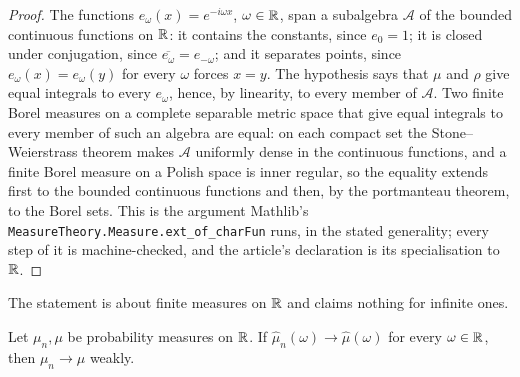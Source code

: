 \begin{proof}
The functions $e_\omega(x) = e^{-i\omega x}$, $\omega \in \mathbb{R}$, span a subalgebra $\mathcal{A}$
of the bounded continuous functions on $\mathbb{R}$: it contains the constants, since $e_0 = 1$; it is
closed under conjugation, since $\overline{e_\omega} = e_{-\omega}$; and it separates points,
since $e_\omega(x) = e_\omega(y)$ for every $\omega$ forces $x = y$. The hypothesis says that
$\mu$ and $\rho$ give equal integrals to every $e_\omega$, hence, by linearity, to every member
of $\mathcal{A}$. Two finite Borel measures on a complete separable metric space that give equal
integrals to every member of such an algebra are equal: on each compact set the
Stone--Weierstrass theorem makes $\mathcal{A}$ uniformly dense in the continuous functions, and a
finite Borel measure on a Polish space is inner regular, so the equality extends first to the
bounded continuous functions and then, by the portmanteau theorem, to the Borel sets. This is
the argument Mathlib's \texttt{MeasureTheory.Measure.ext\_of\_charFun} runs, in the stated
generality; every step of it is machine-checked, and the article's declaration is its
specialisation to $\mathbb{R}$.
\end{proof}

The statement is about finite measures on $\mathbb{R}$ and claims nothing for infinite ones.

\begin{proposition}\label{prop:levy-continuity}
Let $\mu_n, \mu$ be probability measures on $\mathbb{R}$. If $\hat\mu_n(\omega) \to \hat\mu(\omega)$
for every $\omega \in \mathbb{R}$, then $\mu_n \to \mu$ weakly.
\end{proposition}

